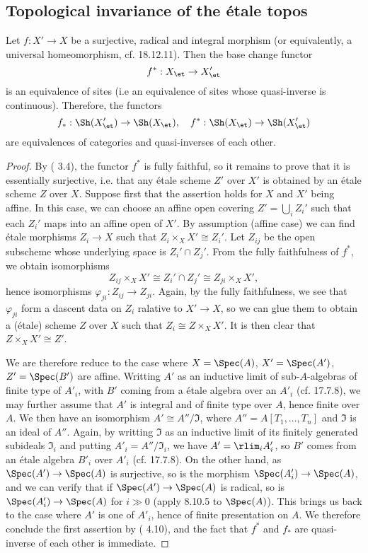 \subsection{Topological invariance of the \'etale topos}
\begin{theorem}\label{scheme etale site equivalence if integral surj radical}
Let $f:X'\to X$ be a surjective, radical and integral morphism (or equivalently, a universal homeomorphism, cf. \cite{EGA4-4} 18.12.11). Then the base change functor
\[f^*:X_\et\to X'_\et\]
is an equivalence of sites (i.e an equivalence of sites whose quasi-inverse is continuous). Therefore, the functors
\[f_*:\Sh(X'_\et)\to\Sh(X_\et),\quad f^*:\Sh(X_\et)\to\Sh(X'_\et)\] 
are equivalences of categories and quasi-inverses of each other.
\end{theorem}
\begin{proof}
By (\cite{SGA1}  3.4), the functor $f^*$ is fully faithful, so it remains to prove that it is essentially surjective, i.e. that any \'etale scheme $Z'$ over $X'$ is obtained by an \'etale scheme $Z$ over $X$. Suppose first that the assertion holds for $X$ and $X'$ being affine. In this case, we can choose an affine open covering $Z'=\bigcup_iZ_i'$ such that each $Z_i'$ maps into an affine open of $X'$. By assumption (affine case) we can find \'etale morphisms $Z_i\to X$ such that $Z_i\times_XX'\cong Z_i'$. Let $Z_{ij}$ be the open subscheme whose underlying space is $Z_i'\cap Z_j'$. From the fully faithfulness of $f^*$, we obtain isomorphisms
\[Z_{ij}\times_XX'\cong Z_i'\cap Z_j'\cong Z_{ji}\times_XX',\]
hence isomorphisms $\varphi_{ji}:Z_{ij}\to Z_{ji}$. Again, by the fully faithfulness, we see that $\varphi_{ji}$ form a dascent data on $Z_i$ ralative to $X'\to X$, so we can glue them to obtain a (\'etale) scheme $Z$ over $X$ such that $Z_i\cong Z\times_XX'$. It is then clear that $Z\times_XX'\cong Z'$.\par
We are therefore reduce to the case where $X=\Spec(A)$, $X'=\Spec(A')$, $Z'=\Spec(B')$ are affine. Writting $A'$ as an inductive limit of sub-$A$-algebras of finite type of $A'_i$, with $B'$ coming from a \'etale algebra over an $A'_i$ (cf. \cite{EGA4-4} 17.7.8), we may further assume that $A'$ is integral and of finite type over $A$, hence finite over $A$. We then have an isomorphism $A'\cong A''/\mathfrak{I}$, where $A''=A[T_1,\dots,T_n]$ and $\mathfrak{I}$ is an ideal of $A''$. Again, by writting $\mathfrak{I}$ as an inductive limit of its finitely generated subideals $\mathfrak{I}_i$ and putting $A'_i=A''/\mathfrak{I}_i$, we have $A'=\rlim_iA'_i$, so $B'$ comes from an \'etale algebra $B'_i$ over $A'_i$ (cf. \cite{EGA4-4} 17.7.8). On the other hand, as $\Spec(A')\to\Spec(A)$ is surjective, so is the morphism $\Spec(A'_i)\to\Spec(A)$, and we can verify that if $\Spec(A')\to\Spec(A)$ is radical, so is $\Spec(A'_i)\to\Spec(A)$ for $i\gg 0$ (apply \cite{EGA4-3} 8.10.5 to $\Spec(A)$). This brings us back to the case where $A'$ is one of $A'_i$, hence of finite presentation on $A$. We therefore conclude the first assertion by (\cite{SGA1}  4.10), and the fact that $f^*$ and $f_*$ are quasi-inverse of each other is immediate.
\end{proof}
